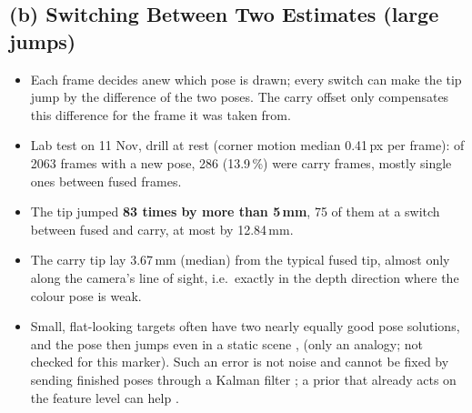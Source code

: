 \documentclass[11pt,a4paper,fleqn]{article}
\begin{document}
\subsection*{(b) Switching Between Two Estimates \textnormal{(large jumps)}}
\begin{itemize}
  \item Each frame decides anew which pose is drawn; every switch can make the tip jump by the difference of the
        two poses. The carry offset only compensates this difference for the frame it was taken from.
  \item Lab test on 11 Nov, drill at rest (corner motion median 0.41\,px per frame): of 2063 frames with a new pose,
        286 (13.9\,\%) were carry frames, mostly single ones between fused frames.
  \item The tip jumped \textbf{83 times by more than 5\,mm}, 75 of them at a switch between fused and carry, at
        most by 12.84\,mm.
  \item The carry tip lay 3.67\,mm (median) from the typical fused tip, almost only along the camera's line of
        sight, i.e.\ exactly in the depth direction where the colour pose is weak.
  \item Small, flat-looking targets often have two nearly equally good pose solutions, and the pose then jumps even
        in a static scene \cite[pp.~2024, 2029]{schweighofer2006robust}, \cite[pp.~5772, 5775]{jin2017sensor}
        (only an analogy; not checked for this marker). Such an error is not noise and cannot be fixed by sending
        finished poses through a Kalman filter \cite[Sec.~I]{liu2021navigation}; a prior that already acts on the
        feature level can help \cite[Sec.~III-D]{liu2021navigation}.
\end{itemize}
\end{document}
